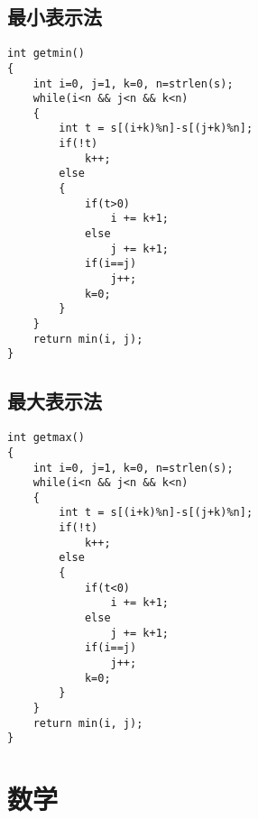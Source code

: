 \subsection{最小表示法}
\begin{lstlisting}
int getmin()
{
	int i=0, j=1, k=0, n=strlen(s);
	while(i<n && j<n && k<n)
	{
		int t = s[(i+k)%n]-s[(j+k)%n];
		if(!t)
			k++;
		else
		{
			if(t>0)
				i += k+1;
			else
				j += k+1;
			if(i==j)
				j++;
			k=0;
		}
	}
	return min(i, j);
}
\end{lstlisting}

\subsection{最大表示法}
\begin{lstlisting}
int getmax()
{
	int i=0, j=1, k=0, n=strlen(s);
	while(i<n && j<n && k<n)
	{
		int t = s[(i+k)%n]-s[(j+k)%n];
		if(!t)
			k++;
		else
		{
			if(t<0)
				i += k+1;
			else
				j += k+1;
			if(i==j)
				j++;
			k=0;
		}
	}
	return min(i, j);
}
\end{lstlisting}

\section{数学}
